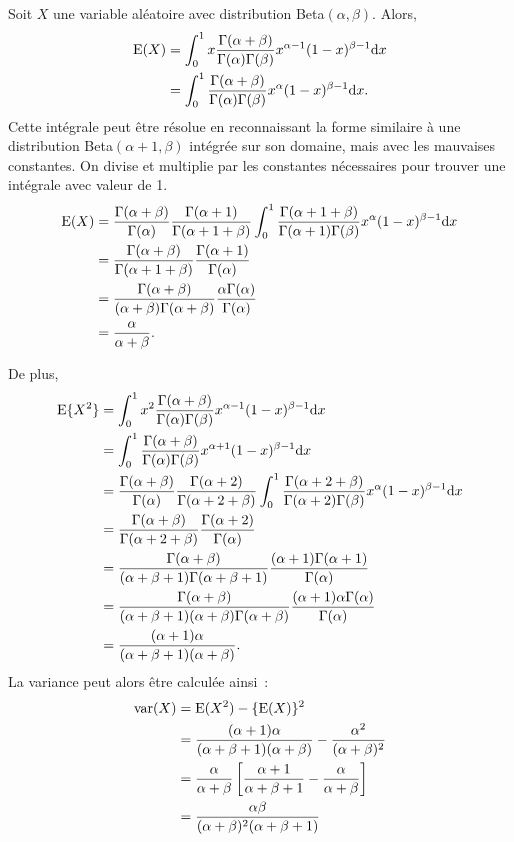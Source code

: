 \begin{solution}{1.4}
Soit $X$ une variable aléatoire avec distribution Beta$(\alpha,\beta)$. Alors,
\begin{align*}
\operatorname{E}(X) & = \int_0^1 x \frac{\Gamma(\alpha+\beta)}{\Gamma(\alpha)\Gamma(\beta)}x^{\alpha-1}(1-x)^{\beta-1}\mbox{d} x\\
&=\int_0^1  \frac{\Gamma(\alpha+\beta)}{\Gamma(\alpha)\Gamma(\beta)}x^{\alpha}(1-x)^{\beta-1}\mbox{d} x.
\end{align*}
Cette intégrale peut être résolue en reconnaissant la forme similaire à une distribution Beta$(\alpha+1,\beta)$ intégrée sur son domaine, mais avec les mauvaises constantes. On divise et multiplie par les constantes nécessaires pour trouver une intégrale avec valeur de 1.
\begin{align*}
\operatorname{E}(X) & =\frac{\Gamma(\alpha+\beta)}{\Gamma(\alpha)}\frac{\Gamma(\alpha+1)}{\Gamma(\alpha+1+\beta)} \int_0^1  \frac{\Gamma(\alpha+1+\beta)}{\Gamma(\alpha+1)\Gamma(\beta)}x^{\alpha}(1-x)^{\beta-1}\mbox{d} x\\
&=\frac{\Gamma(\alpha+\beta)}{\Gamma(\alpha+1+\beta)}\frac{\Gamma(\alpha+1)}{\Gamma(\alpha)}\\
&= \frac{\Gamma(\alpha+\beta)}{(\alpha+\beta)\Gamma(\alpha+\beta)}\frac{ \alpha \Gamma(\alpha) }{\Gamma(\alpha)}\\
&=\frac{\alpha}{\alpha+\beta}.
\end{align*}

De plus,
\begin{align*}
\operatorname{E}\{X^2\} & = \int_0^1 x^2 \frac{\Gamma(\alpha+\beta)}{\Gamma(\alpha)\Gamma(\beta)}x^{\alpha-1}(1-x)^{\beta-1}\mbox{d} x\\
&=\int_0^1  \frac{\Gamma(\alpha+\beta)}{\Gamma(\alpha)\Gamma(\beta)}x^{\alpha+1}(1-x)^{\beta-1}\mbox{d} x\\
& =\frac{\Gamma(\alpha+\beta)}{\Gamma(\alpha)}\frac{\Gamma(\alpha+2)}{\Gamma(\alpha+2+\beta)} \int_0^1  \frac{\Gamma(\alpha+2+\beta)}{\Gamma(\alpha+2)\Gamma(\beta)}x^{\alpha}(1-x)^{\beta-1}\mbox{d} x\\
&=\frac{\Gamma(\alpha+\beta)}{\Gamma(\alpha+2+\beta)}\frac{\Gamma(\alpha+2)}{\Gamma(\alpha)}\\
&= \frac{\Gamma(\alpha+\beta)}{(\alpha+\beta+1)\Gamma(\alpha+\beta+1)}\frac{ (\alpha+1) \Gamma(\alpha+1) }{\Gamma(\alpha)}\\
&= \frac{\Gamma(\alpha+\beta)}{(\alpha+\beta+1)(\alpha+\beta)\Gamma(\alpha+\beta)}\frac{ (\alpha+1)\alpha \Gamma(\alpha) }{\Gamma(\alpha)}\\
&= \frac{(\alpha+1)\alpha}{(\alpha+\beta+1)(\alpha+\beta)}.
\end{align*}
La variance peut alors être calculée ainsi~:
\begin{align*}
\operatorname{var}(X) &= \operatorname{E}(X^2) - \{ \operatorname{E}(X)\}^2 \\
&= \frac{(\alpha+1)\alpha}{(\alpha+\beta+1)(\alpha+\beta)}-\frac{\alpha^2}{(\alpha+\beta)^2} \\
&= \frac{\alpha}{\alpha+\beta}\left[\frac{\alpha+1}{\alpha+\beta+1}-\frac{\alpha}{\alpha+\beta}\right]\\
&= \frac{\alpha\beta}{(\alpha+\beta)^2(\alpha+\beta+1)}
\end{align*}

\end{solution}
